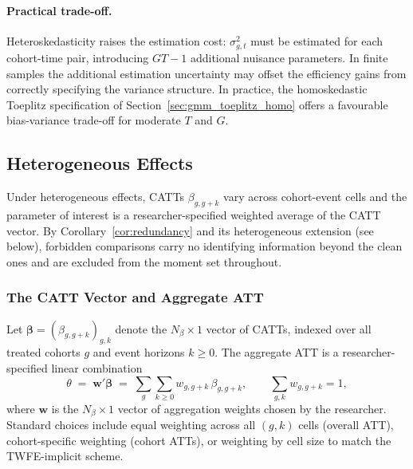 \documentclass[12pt,letterpaper]{article}
\theoremstyle{remark}
\theoremstyle{definition}
\begin{document}
\paragraph{Practical trade-off.}
Heteroskedasticity raises the estimation cost: $\sigma_{g,t}^2$ must be
estimated for each cohort-time pair, introducing $GT-1$ additional nuisance
parameters. In finite samples the additional estimation uncertainty may
offset the efficiency gains from correctly specifying the variance structure.
In practice, the homoskedastic Toeplitz specification of
Section~\ref{sec:gmm_toeplitz_homo} offers a favourable bias-variance
trade-off for moderate $T$ and $G$.

\subsection{Heterogeneous Effects}
\label{sec:gmm_hetero}

Under heterogeneous effects, CATTs $\beta_{g,g+k}$ vary across cohort-event
cells and the parameter of interest is a researcher-specified weighted average
of the CATT vector. By Corollary~\ref{cor:redundancy} and its heterogeneous
extension (see below), forbidden comparisons carry no identifying information
beyond the clean ones and are excluded from the moment set throughout.

\subsubsection{The CATT Vector and Aggregate ATT}
\label{sec:gmm_hetero_catt}

Let $\boldsymbol{\beta}=(\beta_{g,g+k})_{g,k}$ denote the $N_\beta\times1$
vector of CATTs, indexed over all treated cohorts $g$ and event horizons
$k\geq0$. The aggregate ATT is a researcher-specified linear combination
\begin{equation}
  \theta
  \;=\;
  \mathbf{w}'\boldsymbol{\beta}
  \;=\;
  \sum_{g}\sum_{k\geq0} w_{g,g+k}\,\beta_{g,g+k},
  \qquad
  \sum_{g,k}w_{g,g+k}=1,
  \label{eq:att_hetero}
\end{equation}
where $\mathbf{w}$ is the $N_\beta\times1$ vector of aggregation weights
chosen by the researcher. Standard choices include equal weighting across all
$(g,k)$ cells (overall ATT), cohort-specific weighting (cohort ATTs), or
weighting by cell size to match the TWFE-implicit scheme.
\end{document}
